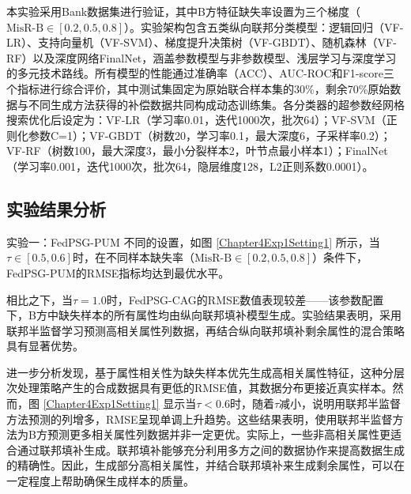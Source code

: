 本实验采用Bank数据集进行验证，其中B方特征缺失率设置为三个梯度（$\text{MisR-B} \in [0.2,0.5,0.8]$）。实验架构包含五类纵向联邦分类模型：逻辑回归（VF-LR）、支持向量机（VF-SVM）、梯度提升决策树（VF-GBDT）、随机森林（VF-RF）以及深度网络FinalNet，涵盖参数模型与非参数模型、浅层学习与深度学习的多元技术路线。所有模型的性能通过准确率（ACC）、AUC-ROC和F1-score三个指标进行综合评价，其中测试集固定为原始联合样本集的30\%，剩余70\%原始数据与不同生成方法获得的补偿数据共同构成动态训练集。各分类器的超参数经网格搜索优化后设定为：VF-LR（学习率0.01，迭代1000次，批次64）；VF-SVM（正则化参数C=1）；VF-GBDT（树数20，学习率0.1，最大深度6，子采样率0.2）；VF-RF（树数100，最大深度3，最小分裂样本2，叶节点最小样本1）；FinalNet（学习率0.001，迭代1000次，批次64，隐层维度128，L2正则系数0.0001）。


\subsection{实验结果分析}

实验一：FedPSG-PUM 不同的设置，如图 \ref{Chapter4Exp1Setting1} 所示，当$\tau \in [0.5,0.6]$时，在不同样本缺失率（$\text{MisR-B} \in [0.2,0.5,0.8]$）条件下，FedPSG-PUM的RMSE指标均达到最优水平。

相比之下，当$\tau = 1.0$时，FedPSG-CAG的RMSE数值表现较差——该参数配置下，B方中缺失样本的所有属性均由纵向联邦填补模型生成。实验结果表明，采用联邦半监督学习预测高相关属性列数据，再结合纵向联邦填补剩余属性的混合策略具有显著优势。

进一步分析发现，基于属性相关性为缺失样本优先生成高相关属性特征，这种分层次处理策略产生的合成数据具有更低的RMSE值，其数据分布更接近真实样本。然而，图 \ref{Chapter4Exp1Setting1} 显示当$\tau < 0.6 $时，随着$\tau$减小，说明用联邦半监督方法预测的列增多，RMSE呈现单调上升趋势。这些结果表明，使用联邦半监督方法为B方预测更多相关属性列数据并非一定更优。实际上，一些非高相关属性更适合通过联邦填补生成。联邦填补能够充分利用多方之间的数据协作来提高数据生成的精确性。因此，生成部分高相关属性，并结合联邦填补来生成剩余属性，可以在一定程度上帮助确保生成样本的质量。

